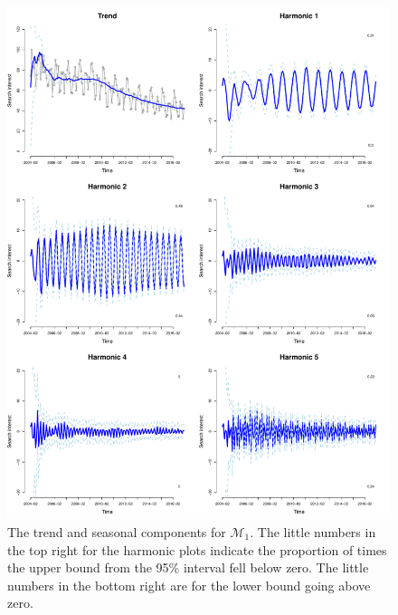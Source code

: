 \documentclass[12pt]{article}
\begin{document}
\begin{figure}[H]
\begin{center}
\includegraphics[scale=0.40]{figs/m1_components.pdf}
\end{center}
\caption{The trend and seasonal components for $\mathcal{M}_1$. The little numbers in the top right for the harmonic plots indicate the proportion of times the upper bound from the 95\% interval fell below zero. The little numbers in the bottom right are for the lower bound going above zero.}
\end{figure}
\end{document}
